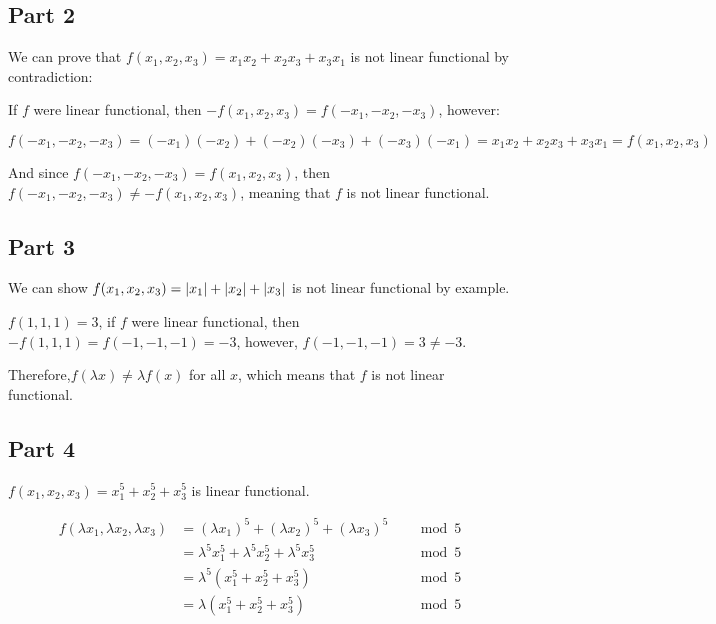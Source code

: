 \documentclass[12pt]{article} %
\begin{document}
\begin{homeworkProblem}
    \subsection*{Part 2}

    We can prove that $f(x_1, x_2, x_3) = x_1x_2 + x_2x_3 + x_3x_1$ is not linear functional by contradiction:


    If $f$ were linear functional, then $- f(x_1, x_2, x_3) = f(-x_1, -x_2, -x_3)$, however:

    $$
        f(-x_1, -x_2, -x_3)  = (-x_1)(-x_2) + (-x_2)(-x_3) + (-x_3)(-x_1) = x_1 x_2 + x_2 x_ 3 + x_3 x_1 = f(x_1, x_2, x_3)
    $$

    And since $f(-x_1, -x_2, -x_3) = f(x_1, x_2, x_3)$, then $f(-x_1, -x_2, -x_3) \not = - f(x_1, x_2, x_3)$, meaning that $f$ is not linear functional.

    \subsection*{Part 3}

    We can show $f(x_1, x_2, x_3) = \abs{x_1} + \abs{x_2} + \abs{x_3}$ is not linear functional by example.

    $f(1, 1, 1) = 3$, if $f$ were linear functional, then $- f(1, 1, 1) = f(-1, -1, -1) = -3$, however, $f(-1, -1, -1) = 3 \not = -3$.

    Therefore,$f(\lambda x) \not = \lambda f(x)$ for all $x$, which means that $f$ is not linear functional.

    \subsection*{Part 4}

    $f(x_1, x_2, x_3) = x_1^5 + x_2^5 + x_3^5$ is linear functional.

    \begin{align*}
        f(\lambda x_1, \lambda x_2, \lambda x_3)
         & = (\lambda x_1)^5 + (\lambda x_2)^5 + (\lambda x_3)^5 &  & \mod{5} \\
         & = \lambda^5 x_1^5 + \lambda^5 x_2^5 + \lambda^5 x_3^5 &  & \mod{5} \\
         & = \lambda^5 (x_1^5 + x_2^5 + x_3^5)                   &  & \mod{5} \\
         & = \lambda (x_1^5 + x_2^5 + x_3^5)                     &  & \mod{5} \\
    \end{align*}


\end{homeworkProblem}
\end{document}

